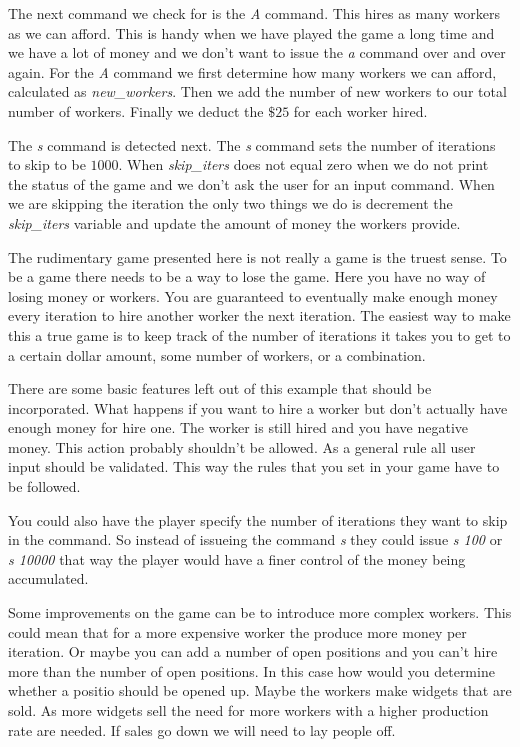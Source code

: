 The next command we check for is the \emph{A} command. This hires as many workers as we can afford. This is handy when we have played the game a long time and we have a lot of money and we don't want to issue the \emph{a} command over and over again. For the \emph{A} command we first determine how many workers we can afford, calculated as \emph{new\_workers}. Then we add the number of new workers to our total number of workers. Finally we deduct the $\$25$ for each worker hired. 

The \emph{s} command is detected next. The \emph{s} command sets the number of iterations to skip to be $1000$. When \emph{skip\_iters} does not equal zero when we do not print the status of the game and we don't ask the user for an input command. When we are skipping the iteration the only two things we do is decrement the \emph{skip\_iters} variable and update the amount of money the workers provide. 



The rudimentary game presented here is not really a game is the truest sense. To be a game there needs to be a way to lose the game. Here you have no way of losing money or workers. You are guaranteed to eventually make enough money every iteration to hire another worker the next iteration. The easiest way to make this a true game is to keep track of the number of iterations it takes you to get to a certain dollar amount, some number of workers, or a combination. 

There are some basic features left out of this example that should be incorporated. What happens if you want to hire a worker but don't actually have enough money for hire one. The worker is still hired and you have negative money. This action probably shouldn't be allowed. As a general rule all user input should be validated. This way the rules that you set in your game have to be followed. 

You could also have the player specify the number of iterations they want to skip in the command. So instead of issueing the command \emph{s} they could issue \emph{s 100} or \emph{s 10000} that way the player would have a finer control of the money being accumulated. 

Some improvements on the game can be to introduce more complex workers. This could mean that for a more expensive worker the produce more money per iteration. Or maybe you can add a number of open positions and you can't hire more than the number of open positions. In this case how would you determine whether a positio should be opened up. Maybe the workers make widgets that are sold. As more widgets sell the need for more workers with a higher production rate are needed. If sales go down we will need to lay people off. 

